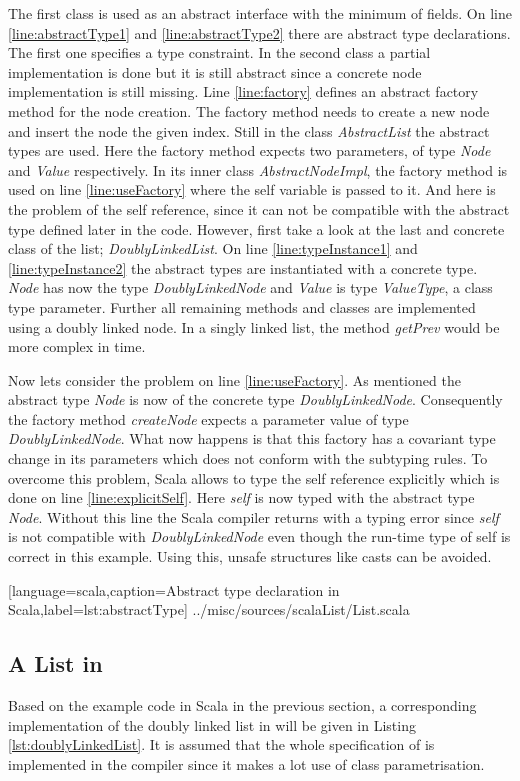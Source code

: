 The first class is used as an abstract interface with the minimum of fields.
On line \ref{line:abstractType1} and \ref{line:abstractType2} there are
abstract type declarations. The first one specifies a type constraint.
In the second class a partial implementation is done but it is
still abstract since a concrete node implementation is still missing. Line
\ref{line:factory} defines an abstract factory method for the node
creation. The factory method needs to create a new node and insert the
node the given index. Still in the class \emph{AbstractList} the abstract
types are used. Here the factory method expects two parameters, of type
\emph{Node} and \emph{Value} respectively. In its inner class \emph{AbstractNodeImpl},
the factory method is used on line \ref{line:useFactory} where the
self variable is passed to it. And here is the problem of the self
reference, since it can not be compatible with the abstract type defined
later in the code. However, first take a look at the last and concrete class
of the list; \emph{DoublyLinkedList}. On line \ref{line:typeInstance1}
and \ref{line:typeInstance2} the abstract types are instantiated with
a concrete type. \emph{Node} has now the type \emph{DoublyLinkedNode} and
\emph{Value} is type \emph{ValueType}, a class type parameter. Further all
remaining methods and classes are implemented using a doubly linked node.
In a singly linked list, the method \emph{getPrev} would be more complex
in time.

Now lets consider the problem on line \ref{line:useFactory}. As
mentioned the abstract type \emph{Node} is now of the concrete
type \emph{DoublyLinkedNode}. Consequently the factory
method \emph{createNode} expects a parameter value of type
\emph{DoublyLinkedNode}. What now happens is that this factory has a
covariant type change in its parameters which does not conform with the
subtyping rules. To overcome this problem, Scala allows to type the
self reference explicitly which is done on line \ref{line:explicitSelf}.
Here \emph{self} is now typed with the abstract type \emph{Node}. Without this
line the Scala compiler returns with a typing error since \emph{self} is not
compatible with \emph{DoublyLinkedNode} even though the run-time
type of self is correct in this example. Using this, unsafe structures
like casts can be avoided.


[language=scala,caption=Abstract type declaration in Scala,label=lst:abstractType]
{../misc/sources/scalaList/List.scala}

\subsection{A List in \ooplss}
Based on the example code in Scala in the previous section, a corresponding
implementation of the doubly linked list in \ooplss will be given in Listing
\ref{lst:doublyLinkedList}. It is assumed that the whole specification
of \ooplss is implemented in the compiler since it makes a lot use
of class parametrisation.

